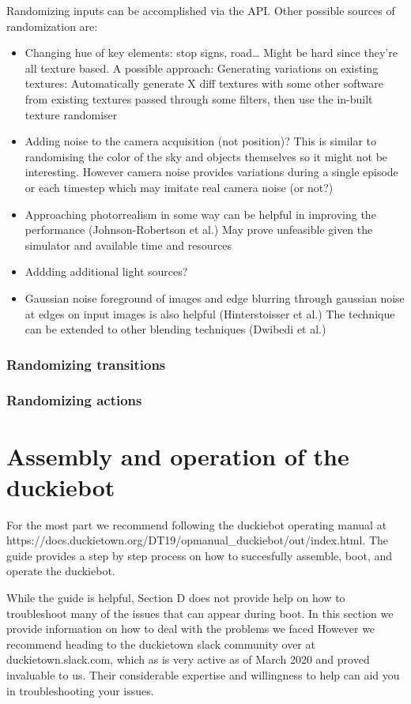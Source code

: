\documentclass[12pt]{article}
\begin{document}
Randomizing inputs can be accomplished via the API. Other possible sources of randomization are:
\begin{itemize}
    \item Changing hue of key elements: stop signs, road… Might be hard since they’re all texture based. A possible approach: Generating variations on existing textures: Automatically generate X diff textures with some other software from existing textures passed through some filters, then use the in-built texture randomiser
    \item Adding noise to the camera acquisition (not position)? This is similar to randomising the color of the sky and objects themselves so it might not be interesting. However camera noise provides variations during a single episode or each timestep which may imitate real camera noise (or not?)
    \item Approaching photorrealism in some way can be helpful in improving the performance (Johnson-Robertson et al.) May prove unfeasible given the simulator and available time and resources
    \item Addding additional light sources?
    \item Gaussian noise foreground of images and edge blurring through gaussian noise at edges on input images is also helpful (Hinterstoisser et al.) The technique can be extended to other blending techniques (Dwibedi et al.)
\end{itemize}
\subsubsection{Randomizing transitions}
\subsubsection{Randomizing actions}

\vfill
\newpage
\section{Assembly and operation of the duckiebot}

For the most part we recommend following the duckiebot operating manual at https://docs.duckietown.org/DT19/opmanual\_duckiebot/out/index.html.
The guide provides a step by step process on how to succesfully assemble, boot, and operate the duckiebot.

While the guide is helpful, Section D does not provide help on how to troubleshoot many of the issues that can appear during boot. In this section we provide information on how to deal with the problems we faced However we recommend heading to the duckietown slack community over at duckietown.slack.com, which as is very active as of March 2020 and proved invaluable to us. Their considerable expertise and willingness to help can aid you in troubleshooting your issues.
\end{document}
